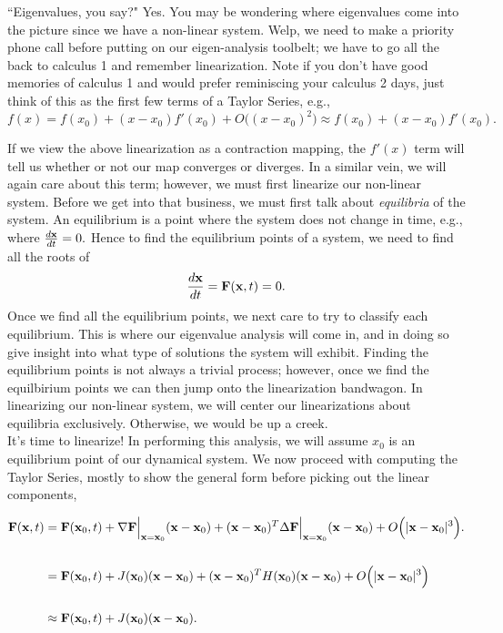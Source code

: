 ``Eigenvalues, you say?" Yes. You may be wondering where eigenvalues come into the picture since we have a non-linear system. Welp, we need to make a priority phone call before putting on our eigen-analysis toolbelt; we have to go all the back to calculus 1 and remember linearization. Note if you don't have good memories of calculus 1 and would prefer reminiscing your calculus 2 days, just think of this as the first few terms of a Taylor Series, e.g., \\

$$f(x) = f(x_0) + (x-x_0) f'(x_0) + O\Big( (x-x_0)^2 \Big) \approx f(x_0) + (x-x_0) f'(x_0).$$

If we view the above linearization as a contraction mapping, the $f'(x)$ term will tell us whether or not our map converges or diverges. In a similar vein, we will again care about this term; however, we must first linearize our non-linear system. Before we get into that business, we must first talk about \emph{equilibria} of the system. An equilibrium is a point where the system does not change in time, e.g., where $\frac{d{\bf{x}}}{dt}= 0.$ Hence to find the equilibrium points of a system, we need to find all the roots of $$ \frac{d{\bf{x}}}{dt} = {\bf{F}}({\bf{x}},t) = 0.$$
%
Once we find all the equilibrium points, we next care to try to classify each equilibrium. This is where our eigenvalue analysis will come in, and in doing so give insight into what type of solutions the system will exhibit. Finding the equilibrium points is not always a trivial process; however, once we find the equilbirium points we can then jump onto the linearization bandwagon. In linearizing our non-linear system, we will center our linearizations about equilibria exclusively. Otherwise, we would be up a creek.  \\

It's time to linearize! In performing this analysis, we will assume $x_0$ is an equilibrium point of our dynamical system. We now proceed with computing the Taylor Series, mostly to show the general form before picking out the linear components,

\begin{align*}
{\bf{F}}({\bf{x}},t) &= {\bf{F}}({\bf{x}}_0,t) + \nabla{\bf{F}}\Big|_{{\bf{x}}={\bf{x}}_0} ({\bf{x}}-{\bf{x}}_0) + ({\bf{x}}-{\bf{x}}_0)^T \Delta{\bf{F}}\Big|_{{\bf{x}}={\bf{x}}_0} ({\bf{x}}-{\bf{x}}_0)  + O\Big( |{\bf{x}}-{\bf{x}}_0|^3 \Big).\\ \\
%
&= {\bf{F}}({\bf{x}}_0,t) + J({\bf{x}}_0) ({\bf{x}}-{\bf{x}}_0) + ({\bf{x}}-{\bf{x}}_0)^T H({\bf{x}}_0) ({\bf{x}}-{\bf{x}}_0)  + O\Big( |{\bf{x}}-{\bf{x}}_0|^3 \Big) \\ \\
%
&\approx {\bf{F}}({\bf{x}}_0,t) + J({\bf{x}}_0) ({\bf{x}}-{\bf{x}}_0).
\end{align*}

